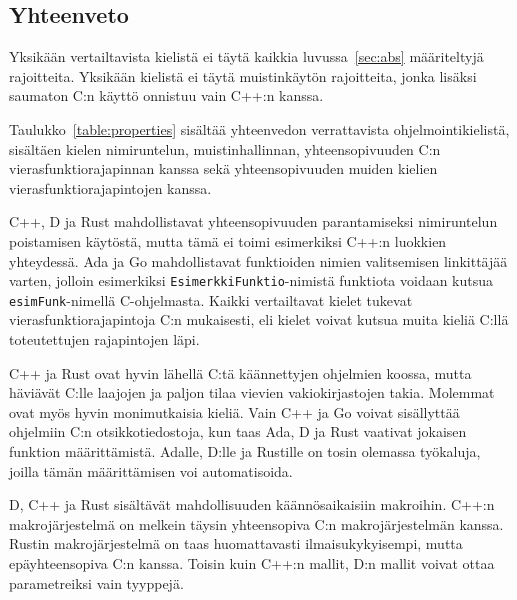 \subsection{Yhteenveto}

Yksikään vertailtavista kielistä ei täytä kaikkia luvussa~\ref{sec:abs}
määriteltyjä rajoitteita. Yksikään kielistä ei täytä muistinkäytön rajoitteita,
jonka lisäksi saumaton C:n käyttö onnistuu vain C++:n kanssa.

Taulukko~\ref{table:properties} sisältää yhteenvedon verrattavista
ohjelmointikielistä, sisältäen kielen nimiruntelun, muistinhallinnan,
yhteensopivuuden C:n vierasfunktiorajapinnan kanssa sekä yhteensopivuuden
muiden kielien vierasfunktiorajapintojen kanssa.

C++, D ja Rust mahdollistavat yhteensopivuuden parantamiseksi nimiruntelun
poistamisen käytöstä, mutta tämä ei toimi esimerkiksi C++:n luokkien
yhteydessä. Ada ja Go mahdollistavat funktioiden nimien valitsemisen
linkittäjää varten, jolloin esimerkiksi \texttt{EsimerkkiFunktio}-nimistä
funktiota voidaan kutsua \texttt{esimFunk}-nimellä C-ohjelmasta. Kaikki
vertailtavat kielet tukevat vierasfunktiorajapintoja C:n mukaisesti, eli kielet
voivat kutsua muita kieliä C:llä toteutettujen rajapintojen läpi.

C++ ja Rust ovat hyvin lähellä C:tä käännettyjen ohjelmien koossa, mutta
häviävät C:lle laajojen ja paljon tilaa vievien vakiokirjastojen takia.
Molemmat ovat myös hyvin monimutkaisia kieliä. Vain C++ ja Go voivat
sisällyttää ohjelmiin C:n otsikkotiedostoja, kun taas Ada, D ja Rust vaativat
jokaisen funktion määrittämistä. Adalle, D:lle ja Rustille on tosin olemassa
työkaluja, joilla tämän määrittämisen voi automatisoida.

D, C++ ja Rust sisältävät mahdollisuuden käännösaikaisiin makroihin. C++:n
makrojärjestelmä on melkein täysin yhteensopiva C:n makrojärjestelmän kanssa.
Rustin makrojärjestelmä on taas huomattavasti ilmaisukykyisempi, mutta
epäyhteensopiva C:n kanssa. Toisin kuin C++:n mallit, D:n mallit voivat ottaa
parametreiksi vain tyyppejä.

\newpage

